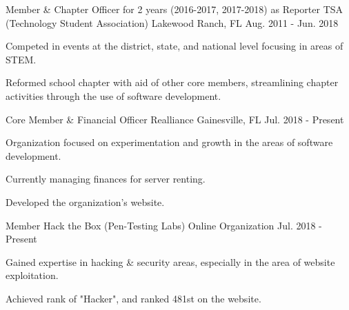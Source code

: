 \begin{cventries}
  \cventry
    {Member \& Chapter Officer for 2 years (2016-2017, 2017-2018) as Reporter}
    {TSA (Technology Student Association)}
    {Lakewood Ranch, FL}
    {Aug. 2011 - Jun. 2018}
    {
      \begin{cvitems}
        \item {Competed in events at the district, state, and national level focusing in areas of STEM.}
        \item {Reformed school chapter with aid of other core members, streamlining chapter activities through the use of software development.}
      \end{cvitems}
    }
  \cventry
    {Core Member \& Financial Officer}
    {Realliance}
    {Gainesville, FL}
    {Jul. 2018 - Present}
    {
      \begin{cvitems}
        \item {Organization focused on experimentation and growth in the areas of software development.}
        \item {Currently managing finances for server renting.}
        \item {Developed the organization's website.}
      \end{cvitems}
    }
  \cventry
    {Member}
    {Hack the Box (Pen-Testing Labs)}
    {Online Organization}
    {Jul. 2018 - Present}
    {
      \begin{cvitems}
        \item {Gained expertise in hacking \& security areas, especially in the area of website exploitation.}
        \item {Achieved rank of "Hacker", and ranked 481st on the website.}
      \end{cvitems}
    }
\end{cventries}
